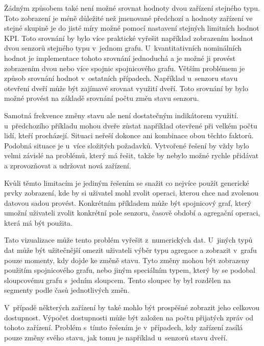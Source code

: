 Žádným způsobem také není možné srovnat hodnoty dvou zařízení stejného typu. Toto zobrazení je méně důležité než jmenované předchozí a hodnoty zařízení ve stejné skupině je do jisté míry možné pomocí nastavení stejných limitních hodnot KPI. Toto srovnání by bylo více praktické vyřešit například zobrazením hodnot dvou senzorů stejného typu v~jednom grafu. U~kvantitativních nominálních hodnot je implementace tohoto srovnání jednoduchá a je možné ji provést zobrazením dvou nebo více spojnic spojnicového grafu. Větším problémem je způsob srovnání hodnot v~ostatních případech. Například u~senzoru stavu otevření dveří může být zajímavé srovnat využití dveří. Toto srovnání by bylo možné provést na základě srovnání počtu změn stavu senzoru.

Samotná frekvence změny stavu ale není dostatečným indikátorem využití. u~předchozího příkladu mohou dveře zůstat například otevřené při velkém počtu lidí, kteří procházejí. Situaci neřeší dokonce ani kombinace obou těchto faktorů. Podobná situace je u~více složitých požadavků. Vytvořené řešení by vždy bylo velmi závislé na problémů, který má řešit, takže by nebylo možné rychle přidávat a zprovozňovat a udržovat nová zařízení. 

Kvůli těmto limitacím je jediným řešením se snažit co nejvíce použít generické prvky zobrazení, kde by si uživatel mohl zvolit operaci, kterou chce nad zvolenou datovou sadou provést. Konkrétním příkladem může být spojnicový graf, který umožní uživateli zvolit konkrétní pole senzoru, časově období a agregační operaci, která má být použita. 

Tato vizualizace může tento problém vyřešit z~numerických dat. U~jiných typů dat může být užitečnější omezit uživateli výběr typu agregace a zobrazit v~grafu pouze momenty, kdy dojde ke změně stavu. Tyto změny mohou být zobrazeny použitím spojnicového grafu, nebo jiným speciálním typem, který by se podobal sloupcovému grafu s~jedním sloupcem. Tento sloupec by byl rozdělen na segmenty podle časů jednotlivých změn.

V~případě některých zařízení by také mohlo být prospěšné zobrazit jeho celkovou dostupnost. Výpočet dostupnosti může být založen na počtu přijatých zpráv od tohoto zařízení. Problém s~tímto řešením je v~případech, kdy zařízení zasílá pouze změny svého stavu, jak tomu je například u~senzorů stavu dveří.


